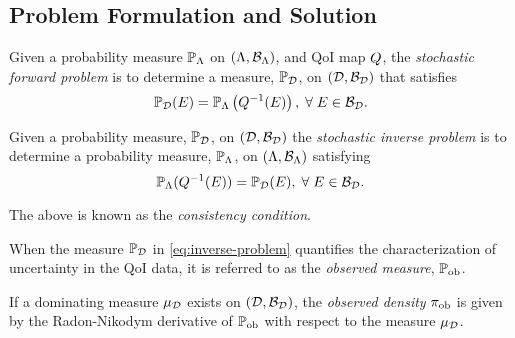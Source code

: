 \subsection{Problem Formulation and Solution}
\begin{frame}[t]

\begin{defn}\label{defn:forward-problem}
  Given a probability measure $\mathbb{P}_{\Lambda}$ on $({\Lambda}, \mathcal{B}_{{\Lambda}})$, and QoI map $Q$, the \emph{stochastic forward problem} is to determine a measure, $\mathbb{P}_{\mathcal{D}}$, on $(\mathcal{D}, \mathcal{B}_{\mathcal{D}})$ that satisfies
  \begin{equation}\label{eq:forward-problem}
    \mathbb{P}_{\mathcal{D}} (E) = \mathbb{P}_{\Lambda} \left ( Q^{-1}(E) \right ), \; \forall \; E \in \mathcal{B}_{\mathcal{D}}.
  \end{equation}
\end{defn}

\end{frame}

\begin{frame}[t]

\begin{defn}\label{defn:inverse-problem}
  Given a probability measure, $\mathbb{P}_{\mathcal{D}}$, on $(\mathcal{D}, \mathcal{B}_{\mathcal{D}})$ the \emph{stochastic inverse problem} is to determine a probability measure, $\mathbb{P}_{\Lambda}$, on $({\Lambda}, \mathcal{B}_{{\Lambda}})$ satisfying
  \begin{equation}\label{eq:inverse-problem}
    \mathbb{P}_{\Lambda} (Q^{-1}(E)) = \mathbb{P}_{\mathcal{D}}(E), \; \forall \; E \in \mathcal{B}_{\mathcal{D}}.
  \end{equation}
\end{defn}

The above is known as the \emph{consistency condition}.

\begin{defn}\label{defn:observed}
  When the measure $\mathbb{P}_{\mathcal{D}}$ in \eqref{eq:inverse-problem} quantifies the characterization of uncertainty in the QoI data, it is referred to as the \emph{observed measure}, $\operatorname*{\mathbb{P}_{ob}}$.

  If a dominating measure $\mu_{\mathcal{D}}$ exists on $(\mathcal{D}, \mathcal{B}_{\mathcal{D}})$, the \emph{observed density} $\operatorname*{\pi_{ob}}$ is given by the Radon-Nikodym derivative of $\operatorname*{\mathbb{P}_{ob}}$ with respect to the measure $\mu_{\mathcal{D}}$.
\end{defn}

\end{frame}

